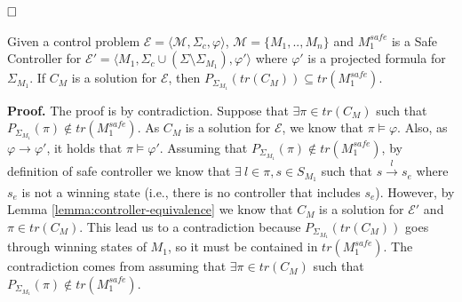 $\hfill \square$

\begin{lemma}
    \label{lemma:traces-inclusion}
    Given a control problem $\mathcal{E} =  \langle \mathcal{M}, \Sigma_c, \varphi \rangle$, $\mathcal{M} = \{M_1, .., M_n\}$ and $M_{1}^{safe}$ is a Safe Controller for $\mathcal{E'} = \langle M_1, \Sigma_c \cup (\Sigma \setminus \Sigma_{M_1}), \varphi' \rangle$ where $\varphi'$ is a projected formula for $\Sigma_{M_1}$. If $C_M$ is a solution for $\mathcal{E}$, then $P_{\Sigma_{M_{1}}}(tr(C_M)) \subseteq tr(M_{1}^{safe})$. 
\end{lemma}
\textbf{Proof.}
The proof is by contradiction. Suppose that $\exists \pi \in tr(C_M)$ such that $P_{\Sigma_{M_{1}}}(\pi) \notin tr(M_{1}^{safe})$. As $C_M$ is a solution for $\mathcal{E}$, we know that $\pi \vDash \varphi$. Also, as $\varphi \xrightarrow[]{} \varphi'$, it holds that $\pi \vDash \varphi'$. Assuming that $P_{\Sigma_{M_{1}}}(\pi) \notin tr(M_{1}^{safe})$, by definition of safe controller we know that $\exists \ l\in \pi, s \in S_{M_1}$ such that $s \xrightarrow[]{l} s_e$ where $s_e$ is not a winning state (i.e., there is no controller that includes $s_e$). However, by Lemma \ref{lemma:controller-equivalence} we know that $C_M$ is a solution for $\mathcal{E'}$ and $\pi \in tr(C_M)$. This lead us to a contradiction because $P_{\Sigma_{M_{1}}}(tr(C_M))$ goes through winning states of $M_1$, so it must be contained in $tr(M_{1}^{safe})$. The contradiction comes from assuming that $\exists \pi \in tr(C_M)$ such that $P_{\Sigma_{M_{1}}}(\pi) \notin tr(M_{1}^{safe})$.\\

